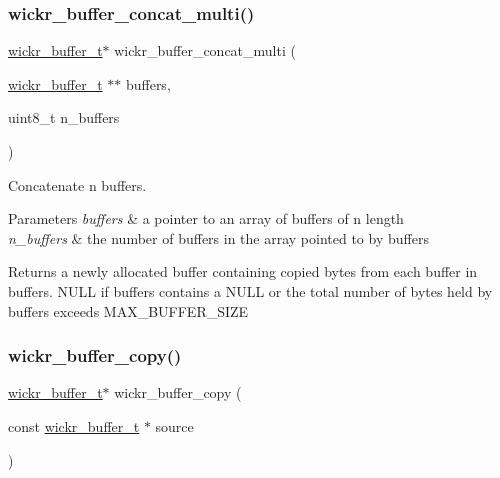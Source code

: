 \subsubsection{\texorpdfstring{wickr\+\_\+buffer\+\_\+concat\+\_\+multi()}{wickr\_buffer\_concat\_multi()}}
{\footnotesize\ttfamily \mbox{\hyperlink{structwickr__buffer}{wickr\+\_\+buffer\+\_\+t}}$\ast$ wickr\+\_\+buffer\+\_\+concat\+\_\+multi (\begin{DoxyParamCaption}\item[{\mbox{\hyperlink{structwickr__buffer}{wickr\+\_\+buffer\+\_\+t}} $\ast$$\ast$}]{buffers,  }\item[{uint8\+\_\+t}]{n\+\_\+buffers }\end{DoxyParamCaption})}



Concatenate n buffers. 


\begin{DoxyParams}{Parameters}
{\em buffers} & a pointer to an array of buffers of n length \\
\hline
{\em n\+\_\+buffers} & the number of buffers in the array pointed to by buffers \\
\hline
\end{DoxyParams}
\begin{DoxyReturn}{Returns}
a newly allocated buffer containing copied bytes from each buffer in \textquotesingle{}buffers\textquotesingle{}. N\+U\+LL if \textquotesingle{}buffers\textquotesingle{} contains a N\+U\+LL or the total number of bytes held by \textquotesingle{}buffers\textquotesingle{} exceeds M\+A\+X\+\_\+\+B\+U\+F\+F\+E\+R\+\_\+\+S\+I\+ZE 
\end{DoxyReturn}
\mbox{\label{group__wickr__buffer_gada179dda91e748d7bdf6028d3d4c4bcd}} 
\subsubsection{\texorpdfstring{wickr\+\_\+buffer\+\_\+copy()}{wickr\_buffer\_copy()}}
{\footnotesize\ttfamily \mbox{\hyperlink{structwickr__buffer}{wickr\+\_\+buffer\+\_\+t}}$\ast$ wickr\+\_\+buffer\+\_\+copy (\begin{DoxyParamCaption}\item[{const \mbox{\hyperlink{structwickr__buffer}{wickr\+\_\+buffer\+\_\+t}} $\ast$}]{source }\end{DoxyParamCaption})}



